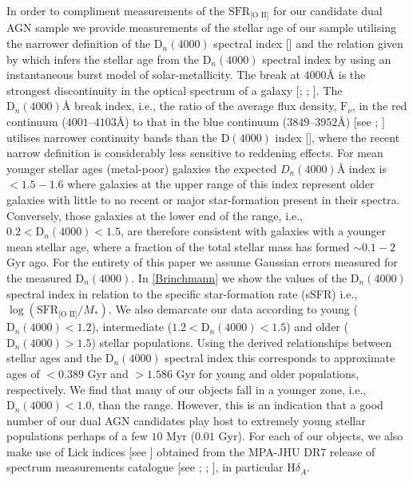 In order to compliment measurements of the $\text{SFR}_{\text{[O II]}}$ for our candidate dual AGN sample we provide measurements of the stellar age of our sample utilising the narrower definition of the $\text{D}_{n}(4000)$ spectral index [\cite{Balogh_1999}] and the relation given by \cite{Kauffmann_2003} which infers the stellar age from the $\text{D}_{n}(4000)$ spectral index by using an instantaneous burst model of solar-metallicity. The break at $4000Å$ is the strongest discontinuity in the optical spectrum of a galaxy [\cite{Bruzual_A__1983}; \cite{Balogh_1999}; \cite{Kauffmann_2003}]. The $\text{D}_{n}(4000)Å$ break index, i.e., the ratio of the average flux density, $\text{F}_{\nu}$, in the red continuum ($4001$--$4103$$Å$) to that in the blue continuum ($3849$--$3952$$Å$) [see \cite{Balogh_1999}; \cite{Kauffmann_2003}] utilises narrower continuity bands than the $\text{D}(4000)$ index [\cite{Bruzual_A__1983}], where the recent narrow definition is considerably less sensitive to reddening effects. For mean younger stellar ages (metal-poor) galaxies the expected $D_{n}(4000)Å$ index is $<{1.5-1.6}$ where galaxies at the upper range of this index represent older galaxies with little to no recent or major star-formation present in their spectra. Conversely, those galaxies at the lower end of the range, i.e., ${0.2}<{\text{D}_{n}(4000)}<{1.5}$, are therefore consistent with galaxies with a younger mean stellar age, where a fraction of the total stellar mass has formed $\sim{0.1-2}$ $\text{Gyr}$ ago. For the entirety of this paper we assume Gaussian errors measured for the measured $\text{D}_{n}(4000)$. In \ref{Brinchmann} we show the values of the $\text{D}_{n}(4000)$ spectral index in relation to the specific star-formation rate (sSFR) i.e., $\log{(\text{SFR}_{\text{[O II]}}/M_{*})}$. We also demarcate our data according to young ($\text{D}_{n}(4000)<{1.2}$), intermediate (${1.2}<{\text{D}_{n}(4000)}<{1.5}$) and older ($\text{D}_{n}(4000)>{1.5}$) stellar populations. Using the derived relationships between stellar ages and the $\text{D}_{n}(4000)$ spectral index this corresponds to approximate ages of $<0.389$ Gyr and $>{1.586}$ Gyr for young and older populations, respectively. We find that many of our objects fall in a younger zone, i.e., $\text{D}_{n}(4000)<{1.0}$, than the \cite{Kauffmann_2003} range. However, this is an indication that a good number of our dual AGN candidates play host to extremely young stellar populations perhaps of a few $10$ Myr ($0.01$ Gyr). For each of our objects, we also make use of Lick indices [see \cite{Worthey_1997}] obtained from the MPA-JHU DR7 release of spectrum measurements catalogue [see \cite{Kauffmann_2003}; \cite{Brinchmann_2004}; \cite{Salim_2007}], in particular $\text{H}\delta_{A}$.

